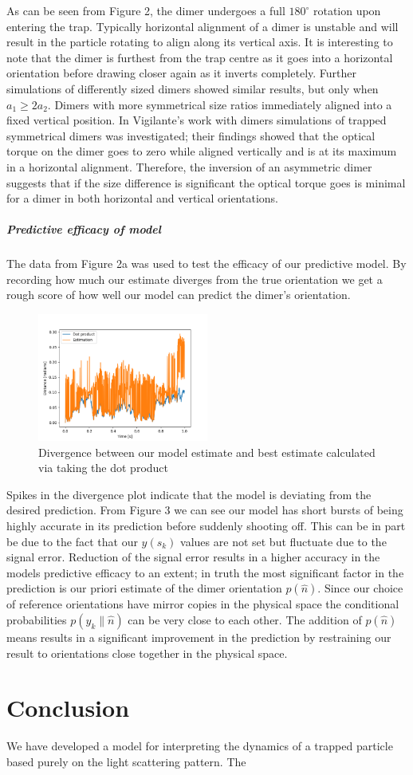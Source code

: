\documentclass[11pt]{article}
\begin{document}
As can be seen from Figure 2, the dimer undergoes a full $180^{\circ}$ rotation upon entering the trap. Typically horizontal alignment of a dimer is unstable and will result in the particle rotating to align along its vertical axis. It is interesting to note that the dimer is furthest from the trap centre as it goes into a horizontal orientation before drawing closer again as it inverts completely. Further simulations of differently sized dimers showed similar results, but only when $a_1 \geq 2a_2$. Dimers with more symmetrical size ratios immediately aligned into a fixed vertical position. 
In Vigilante's work with dimers \cite{5} simulations of trapped symmetrical dimers was investigated; their findings showed that the optical torque on the dimer goes to zero while aligned vertically and is at its maximum in a horizontal alignment. Therefore, the inversion of an asymmetric dimer suggests that if the size difference is significant the optical torque goes is minimal for a dimer in both horizontal and vertical orientations. 

\subparagraph*{Predictive efficacy of model}
The data from Figure 2a was used to test the efficacy of our predictive model. By recording how much our estimate diverges from the true orientation we get a rough score of how well our model can predict the dimer's orientation.

\begin{figure}[h]
	\centering
	\includegraphics[width=0.5\textwidth]{Divergance.png}
	\caption{Divergence between our model estimate and best estimate calculated via taking the dot product}
\end{figure}

Spikes in the divergence plot indicate that the model is deviating  from the desired prediction. From Figure 3 we can see our model has short bursts of being highly accurate in its prediction before suddenly shooting off. This can be in part be due to the fact that our $y(\hat{s}_k)$ values are not set but fluctuate due to the signal error. Reduction of the signal error results in a higher accuracy in the models predictive efficacy to an extent; in truth the most significant factor in the prediction is our priori estimate of the dimer orientation $p(\hat{n})$. Since our choice of reference orientations have mirror copies in the physical space the conditional probabilities $p(y_k\parallel\hat{n})$ can be very close to each other. The addition of $p(\hat{n})$ means results in a significant improvement in the prediction by restraining our result to orientations close together in the physical space. 

\section*{Conclusion}
We have developed a model for interpreting the dynamics of a trapped particle based purely on the light scattering pattern. The 



\end{document}
